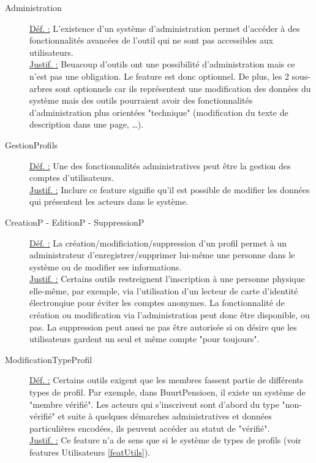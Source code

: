 \begin{description}
\begin{center}
\end{center}

\item [Administration]
\underline{Déf. :}  L'existence d'un système d'administration permet d'accéder à des fonctionnalités avancées de l'outil qui ne sont pas accessibles aux utilisateurs.
\\ \underline{Justif. :}  Beuacoup d'outils ont une possibilité d'administration mais ce n'est pas une obligation.  Le feature est donc optionnel.  De plus,  les 2 sous-arbres sont optionnels car ils représentent une modification des données du système mais des outils pourraient avoir des fonctionnalités d'administration plus orientées "technique" (modification du texte de description dans une page, \dots).
\newline

\item [GestionProfils]
\underline{Déf. :}  Une des fonctionnalités administratives peut être la gestion des comptes d'utilisateurs.
\\ \underline{Justif. :}  Inclure ce feature signifie qu'il est possible de modifier les données qui présentent les acteurs dans le système.
\newline

\item [CreationP - EditionP - SuppressionP]
\underline{Déf. :}  La création/modificiation/suppression d'un profil permet à un administrateur d'enregistrer/supprimer lui-même une personne dans le système ou de modifier ses informations.
\\ \underline{Justif. :}  Certains outils restreignent l'inscription à une personne physique elle-même,  par exemple,  via l'utilisation d'un lecteur de carte d'identité électronqiue pour éviter les comptes anonymes.  La fonctionnalité de création ou modification via l'administration peut donc être disponible,  ou pas.  La suppression peut aussi ne pas être autorisée si on désire que les utilisateurs gardent un seul et même compte "pour toujours". 
\newline

\item [ModificationTypeProfil]
\label{featTypes}
\underline{Déf. :}  Certains outils exigent que les membres fassent partie de différents types de profil.  Par exemple,  dans BuurtPensioen,  il existe un système de "membre vérifié".  Les acteurs qui s'inscrivent sont d'abord du type "non-vérifié" et suite à quelques démarches administratives et données particulières encodées,  ils peuvent accéder au statut de "vérifié".  
\\ \underline{Justif. :}  Ce feature n'a de sens que si le système de types de profils (voir features Utilisateurs \ref{featUtils}).
\newline


\end{description}
